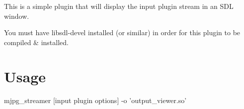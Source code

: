 This is a simple plugin that will display the input plugin stream in an S\+D\+L window.

You must have libsdl-\/devel installed (or similar) in order for this plugin to be compiled \& installed.

\section*{Usage }

\begin{DoxyVerb}mjpg_streamer [input plugin options] -o 'output_viewer.so' \end{DoxyVerb}
 